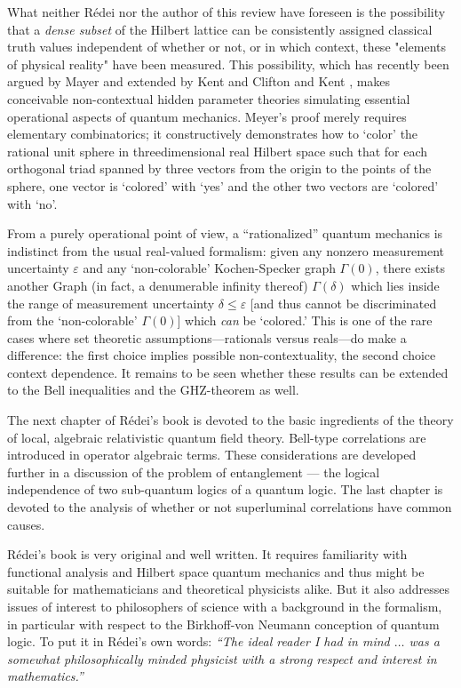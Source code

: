 What neither R{\'{e}}dei nor the author of this review have foreseen
is the possibility that a {\it dense subset} of the Hilbert lattice can
be consistently assigned classical
truth values independent of whether or not, or in which context, these
"elements of physical
reality" have been measured. This possibility, which has recently been
argued by Mayer \cite{meyer:99} and
extended by
Kent \cite{kent:99} and Clifton and Kent \cite{clifton:99},
makes conceivable non-contextual
hidden parameter theories
simulating essential operational aspects of quantum mechanics.
Meyer's  proof merely requires elementary combinatorics; it
constructively demonstrates how to `color' the rational unit sphere in
threedimensional real Hilbert space such that for each orthogonal triad
spanned by three vectors from the origin to the points of the sphere,
one vector is `colored' with `yes' and the other two vectors are
`colored' with `no'.

From a purely operational point of view, a ``rationalized''
quantum mechanics is indistinct from the usual real-valued formalism:
given any nonzero measurement uncertainty $\varepsilon$ and any
`non-colorable' Kochen-Specker graph $\Gamma (0)$,  there
exists another Graph (in fact, a denumerable infinity thereof)
$\Gamma (\delta)$
which lies inside the range of measurement uncertainty
$\delta \le \varepsilon$
[and thus cannot be discriminated from the `non-colorable'
$\Gamma (0)$]
which {\it can} be `colored.'
This is one of the rare cases where set theoretic
assumptions---rationals versus reals---do make a
difference: the first choice implies possible non-contextuality, the
second choice context dependence.
It remains to be seen whether these results can be extended to the Bell
inequalities and the GHZ-theorem as well.

The next chapter of R{\'{e}}dei's book is devoted to the basic ingredients of the theory
of local, algebraic relativistic quantum field theory. Bell-type
correlations are introduced in operator algebraic terms. These
considerations are developed further in a discussion of the problem of
entanglement --- the logical independence of two sub-quantum logics of a
quantum logic. The last chapter is devoted to the analysis of whether or
not superluminal correlations have common causes.

R{\'{e}}dei's book is very original and well written. It requires
familiarity with functional analysis and Hilbert space quantum mechanics
and thus might be suitable for mathematicians and theoretical physicists
alike.
But it also addresses issues of interest to philosophers of science
with a background in the formalism,
in particular with respect to the Birkhoff-von Neumann conception of
quantum logic. To put it in R{\'{e}}dei's own words: {\it ``The ideal
reader I had in mind  $\ldots$ was a somewhat philosophically minded
physicist with a strong respect and interest in mathematics.''}


